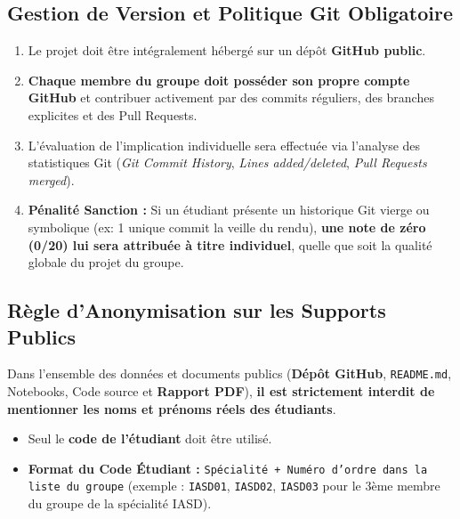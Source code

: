 \documentclass[11pt,a4paper]{article}
\begin{document}
\subsection{Gestion de Version et Politique Git Obligatoire}
\begin{tcolorbox}[colback=sintefred!10, colframe=sintefred, title=\textbf{ATTENTION — POLITIQUE DE TRAÇABILITÉ GIT STRICTE}, arc=2mm]
    \begin{enumerate}[leftmargin=*]
        \item Le projet doit être intégralement hébergé sur un dépôt \textbf{GitHub public}.
        \item \textbf{Chaque membre du groupe doit posséder son propre compte GitHub} et contribuer activement par des commits réguliers, des branches explicites et des Pull Requests.
        \item L'évaluation de l'implication individuelle sera effectuée via l'analyse des statistiques Git (\textit{Git Commit History}, \textit{Lines added/deleted}, \textit{Pull Requests merged}).
        \item \textbf{Pénalité Sanction :} Si un étudiant présente un historique Git vierge ou symbolique (ex: 1 unique commit la veille du rendu), \textbf{une note de zéro (0/20) lui sera attribuée à titre individuel}, quelle que soit la qualité globale du projet du groupe.
    \end{enumerate}
\end{tcolorbox}

\subsection{Règle d'Anonymisation sur les Supports Publics}
\begin{tcolorbox}[colback=sintefgold!15, colframe=sintefgold!80!black, title=\textbf{CONFIDENTIALITÉ ET ANONYMAT SUR LES SUPPORTS PUBLICS}, arc=2mm]
    Dans l'ensemble des données et documents publics (\textbf{Dépôt GitHub}, \texttt{README.md}, Notebooks, Code source et \textbf{Rapport PDF}), \textbf{il est strictement interdit de mentionner les noms et prénoms réels des étudiants}.
    \begin{itemize}[leftmargin=*]
        \item Seul le \textbf{code de l'étudiant} doit être utilisé.
        \item \textbf{Format du Code Étudiant :} \texttt{Spécialité + Numéro d'ordre dans la liste du groupe} (exemple : \texttt{IASD01}, \texttt{IASD02}, \texttt{IASD03} pour le 3ème membre du groupe de la spécialité IASD).
    \end{itemize}
\end{tcolorbox}
\end{document}
